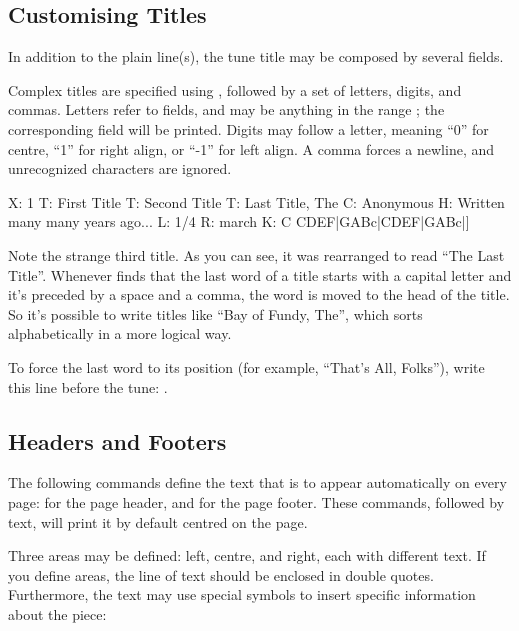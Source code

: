 \documentclass[a4paper,fullpage,12pt]{book}
\begin{document}


\subsection{Customising Titles}
\label{sec:titles}

In addition to the plain  line(s), the tune title may be
composed by several fields.

Complex titles are specified using , followed by
a set of letters, digits, and commas. Letters refer to \ABC{} fields,
and may be anything in the range ; the
corresponding field will be printed. Digits may follow a letter,
meaning ``0'' for centre, ``1'' for right align, or ``-1'' for left
align. A comma \car{,} forces a newline, and unrecognized characters
are ignored.

\begin{abcsource}
X: 1
T: First Title
T: Second Title
T: Last Title, The
C: Anonymous
H: Written many many years ago...
L: 1/4
R: march
K: C
CDEF|GABc|CDEF|GABc|]
\end{abcsource}


Note the strange third title. As you can see, it was rearranged to
read ``The Last Title''. Whenever \abcm{} finds that the last word of
a title starts with a capital letter and it's preceded by a space and
a comma, the word is moved to the head of the title. So it's possible
to write titles like ``Bay of Fundy, The'', which sorts alphabetically
in a more logical way.

To force the last word to its position (for example, ``That's All,
Folks''), write this line before the tune: .


\subsection{Headers and Footers}
\label{sec:headerfooter}

The following commands define the text that is to appear automatically
on every page:  for the page header, and
 for the page footer. These commands, followed by
text, will print it by default centred on the page.

Three areas may be defined: left, centre, and right, each with
different text. If you define areas, the line of text should be
enclosed in double quotes. Furthermore, the text may use special
symbols to insert specific information about the piece:
\end{document}

